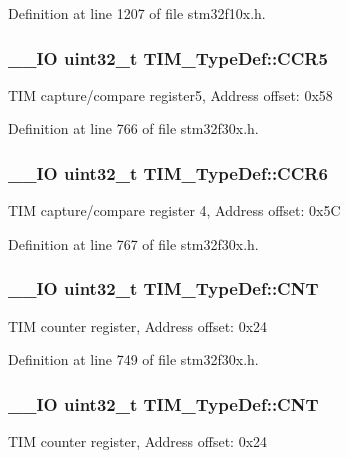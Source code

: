 Definition at line 1207 of file stm32f10x.\-h.

\hypertarget{struct_t_i_m___type_def_af30dc563e6c1b7b7e01e393feb484080}{
\subsubsection[{C\-C\-R5}]{\setlength{\rightskip}{0pt plus 5cm}\-\_\-\-\_\-\-I\-O {\bf uint32\-\_\-t} T\-I\-M\-\_\-\-Type\-Def\-::\-C\-C\-R5}}\label{struct_t_i_m___type_def_af30dc563e6c1b7b7e01e393feb484080}
T\-I\-M capture/compare register5, Address offset\-: 0x58 

Definition at line 766 of file stm32f30x.\-h.

\hypertarget{struct_t_i_m___type_def_a374f851b5f1097a3ebd3f494ded6512a}{
\subsubsection[{C\-C\-R6}]{\setlength{\rightskip}{0pt plus 5cm}\-\_\-\-\_\-\-I\-O {\bf uint32\-\_\-t} T\-I\-M\-\_\-\-Type\-Def\-::\-C\-C\-R6}}\label{struct_t_i_m___type_def_a374f851b5f1097a3ebd3f494ded6512a}
T\-I\-M capture/compare register 4, Address offset\-: 0x5\-C 

Definition at line 767 of file stm32f30x.\-h.

\hypertarget{struct_t_i_m___type_def_a6fdd2a7fb88d28670b472aaac0d9d262}{
\subsubsection[{C\-N\-T}]{\setlength{\rightskip}{0pt plus 5cm}\-\_\-\-\_\-\-I\-O {\bf uint32\-\_\-t} T\-I\-M\-\_\-\-Type\-Def\-::\-C\-N\-T}}\label{struct_t_i_m___type_def_a6fdd2a7fb88d28670b472aaac0d9d262}
T\-I\-M counter register, Address offset\-: 0x24 

Definition at line 749 of file stm32f30x.\-h.

\hypertarget{struct_t_i_m___type_def_a6fdd2a7fb88d28670b472aaac0d9d262}{
\subsubsection[{C\-N\-T}]{\setlength{\rightskip}{0pt plus 5cm}\-\_\-\-\_\-\-I\-O {\bf uint32\-\_\-t} T\-I\-M\-\_\-\-Type\-Def\-::\-C\-N\-T}}\label{struct_t_i_m___type_def_a6fdd2a7fb88d28670b472aaac0d9d262}
T\-I\-M counter register, Address offset\-: 0x24 

